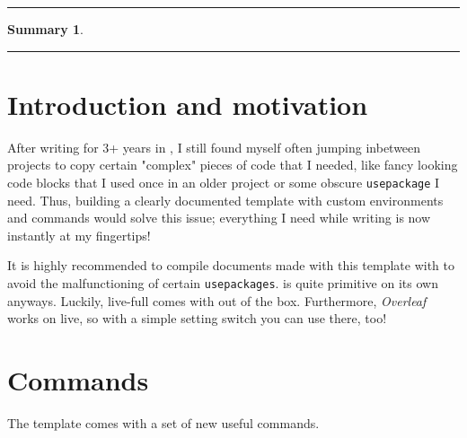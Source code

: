 \documentclass[leqno]{article}			%
\begin{document}

\begin{titlepage}
	\vspace*{1cm}
	\Large
    \textit{\Institute}
    \vspace{0.25cm}

	\Huge
    \textbf{\Title}
    \vspace{0.25cm}

	\Large
	\Author
	\vspace{1.0cm}

	\normalsize
	\rule{\textwidth}{0.4pt}
	\newtheorem*{summary}{Summary}
	\begin{summary}
		\Docsummary
	\end{summary}
	\setcounter{tocdepth}{1}
	\tableofcontents
	\vfill
	\rule{\textwidth}{0.4pt}
\end{titlepage}


\section{Introduction and motivation}
\label{s:intro}
After writing for 3+ years in \LaTeXe, I still found myself often jumping inbetween projects to copy certain "complex" pieces of code that I needed, like fancy looking code blocks that I used once in an older project or some obscure \texttt{usepackage} I need. Thus, building a clearly documented template with custom environments and commands would solve this issue; everything I need while writing is now instantly at my fingertips!

It is highly recommended to compile documents made with this template with
 to avoid the malfunctioning of certain \texttt{usepackages}.
 is quite primitive on its own anyways. Luckily,
live-full comes with  out of the box. Furthermore,
\textit{Overleaf} works on live, so with a simple setting switch
you can use  there, too!

\newpage
\section{Commands}
\label{s:commands}
The template comes with a set of new useful commands.
\end{document}
